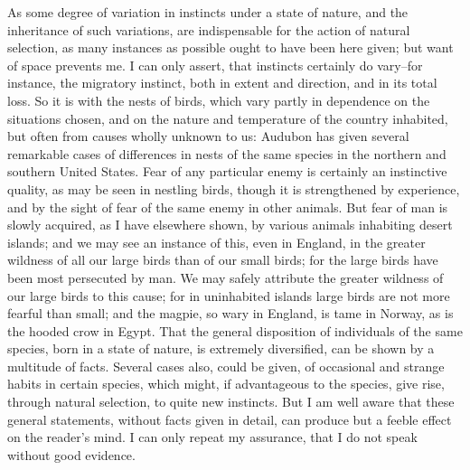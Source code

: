As some degree of variation in instincts under a state of nature, and the inheritance of such variations, are indispensable for the action of natural selection, as many instances as possible ought to have been here given; but want of space prevents me. I can only assert, that instincts certainly do vary--for instance, the migratory instinct, both in extent and direction, and in its total loss. So it is with the nests of birds, which vary partly in dependence on the situations chosen, and on the nature and temperature of the country inhabited, but often from causes wholly unknown to us: Audubon has given several remarkable cases of differences in nests of the same species in the northern and southern United States. Fear of any particular enemy is certainly an instinctive quality, as may be seen in nestling birds, though it is strengthened by experience, and by the sight of fear of the same enemy in other animals. But fear of man is slowly acquired, as I have elsewhere shown, by various animals inhabiting desert islands; and we may see an instance of this, even in England, in the greater wildness of all our large birds than of our small birds; for the large birds have been most persecuted by man. We may safely attribute the greater wildness of our large birds to this cause; for in uninhabited islands large birds are not more fearful than small; and the magpie, so wary in England, is tame in Norway, as is the hooded crow in Egypt.
That the general disposition of individuals of the same species, born in a state of nature, is extremely diversified, can be shown by a multitude of facts. Several cases also, could be given, of occasional and strange habits in certain species, which might, if advantageous to the species, give rise, through natural selection, to quite new instincts. But I am well aware that these general statements, without facts given in detail, can produce but a feeble effect on the reader's mind. I can only repeat my assurance, that I do not speak without good evidence.

